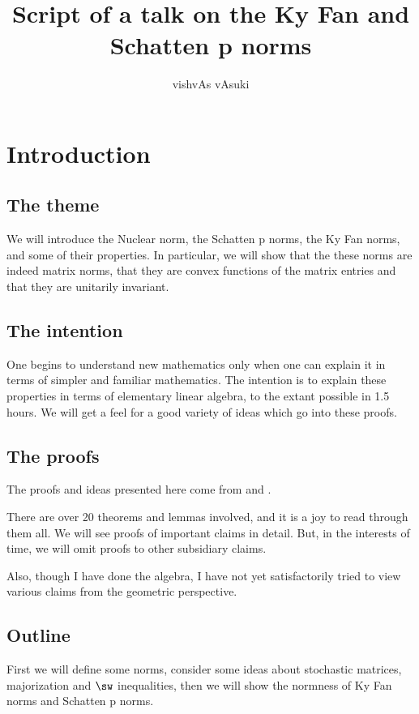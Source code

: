 \documentclass[10pt]{amsart}
\title{Script of a talk on the Ky Fan and Schatten p norms}
\author{vishvAs vAsuki}
\begin{document}
\maketitle

\tableofcontents

\section{Introduction}
\subsection{The theme}
We will introduce the Nuclear norm, the Schatten p norms, the Ky Fan norms, and some of their properties. In particular, we will show that the these norms are indeed matrix norms, that they are convex functions of the matrix entries and that they are unitarily invariant.

\subsection{The intention}
One begins to understand new mathematics only when one can explain it in terms of simpler and familiar mathematics. The intention is to explain these properties in terms of elementary linear algebra, to the extant possible in 1.5 hours. We will get a feel for a good variety of ideas which go into these proofs.

\subsection{The proofs}
The proofs and ideas presented here come from \cite{hornJohnson} and  \cite{hornJohnsonTopics}.

There are over 20 theorems and lemmas involved, and it is a joy to read through them all. We will see proofs of important claims in detail. But, in the interests of time, we will omit proofs to other subsidiary claims.

Also, though I have done the algebra, I have not yet satisfactorily tried to view various claims from the geometric perspective.

\subsection{Outline}
First we will define some norms, consider some ideas about stochastic matrices, majorization and $\sw$ inequalities, then we will show the normness of Ky Fan norms and Schatten p norms.
\end{document}
